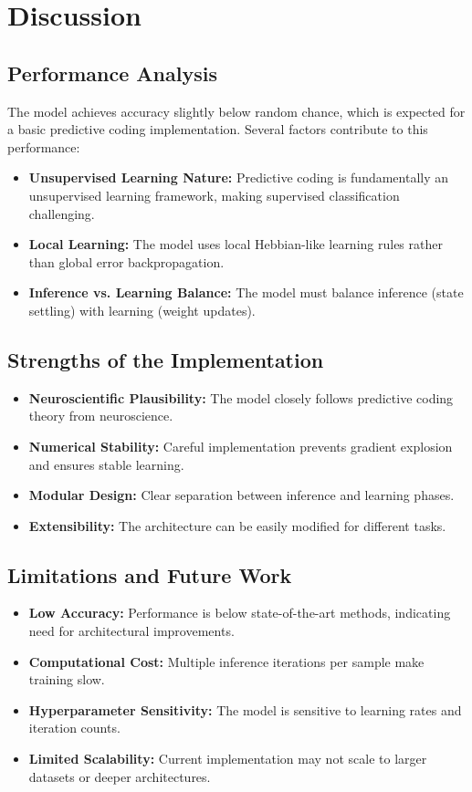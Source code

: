 \documentclass[a4paper,12pt]{article}
\begin{document}
\section{Discussion}
\subsection{Performance Analysis}
The model achieves accuracy slightly below random chance, which is expected for a basic predictive coding implementation. Several factors contribute to this performance:

\begin{itemize}
    \item \textbf{Unsupervised Learning Nature:} Predictive coding is fundamentally an unsupervised learning framework, making supervised classification challenging.
    \item \textbf{Local Learning:} The model uses local Hebbian-like learning rules rather than global error backpropagation.
    \item \textbf{Inference vs. Learning Balance:} The model must balance inference (state settling) with learning (weight updates).
\end{itemize}

\subsection{Strengths of the Implementation}
\begin{itemize}
    \item \textbf{Neuroscientific Plausibility:} The model closely follows predictive coding theory from neuroscience.
    \item \textbf{Numerical Stability:} Careful implementation prevents gradient explosion and ensures stable learning.
    \item \textbf{Modular Design:} Clear separation between inference and learning phases.
    \item \textbf{Extensibility:} The architecture can be easily modified for different tasks.
\end{itemize}

\subsection{Limitations and Future Work}
\begin{itemize}
    \item \textbf{Low Accuracy:} Performance is below state-of-the-art methods, indicating need for architectural improvements.
    \item \textbf{Computational Cost:} Multiple inference iterations per sample make training slow.
    \item \textbf{Hyperparameter Sensitivity:} The model is sensitive to learning rates and iteration counts.
    \item \textbf{Limited Scalability:} Current implementation may not scale to larger datasets or deeper architectures.
\end{itemize}
\end{document}
